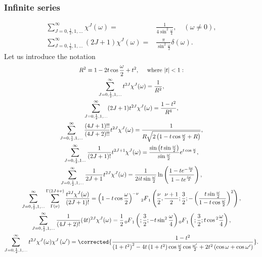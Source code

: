 \subsubsection{ Infinite series}
\begin{align}
\sum_{J=0, \frac{1}{2}, 1, \ldots}^{\infty} \chi^{J}(\omega)=&\frac{1}{4 \sin ^{2} \frac{\omega}{4}}, \quad(\omega \neq 0) , \label{eq:4:14:52}\\
\sum_{J=0, \frac{1}{2}, 1, \ldots}^{\infty}(2 J+1) \chi^{J}(\omega)=&\frac{\pi}{\sin ^{2} \frac{\omega}{2}} \delta(\omega) .\label{eq:4:14:53}
\end{align}
Let us introduce the notation
\begin{gather}
R^{2} \equiv 1-2 t \cos \frac{\omega}{2}+t^{2}, \quad \text { where }|t|<1:  \label{eq:4:14:54}\\
\sum_{J=0, \frac{1}{2}, 1, \ldots}^{\infty} t^{2 J} \chi^{J}(\omega)=\frac{1}{R^{2}},  \label{eq:4:14:55}\\
\sum_{J=0, \frac{1}{2}, 1, \ldots}^{\infty}(2 J+1) t^{2 J} \chi^{J}(\omega)=\frac{1-t^{2}}{R^{4}},  \label{eq:4:14:56}\\
\sum_{J=0, \frac{1}{2}, 1, \ldots}^{\infty} \frac{(4 J+1)!!}{(4 J+2)!!} t^{2 J} \chi^{J}(\omega)=\frac{1}{R \sqrt{2\left(1-t \cos \frac{\omega}{2}+R\right)}},  \label{eq:4:14:57}\\
\sum_{J=0, \frac{1}{2}, 1 \ldots}^{\infty} \frac{1}{(2 J+1)!} t^{2 J+1} \chi^{J}(\omega)=\frac{\sin \left(t \sin \frac{\omega}{2}\right)}{\sin \frac{\omega}{2}} e^{t \cos \frac{\omega}{2}},  \label{eq:4:14:58}\\
\sum_{J=0, \frac{1}{2}, 1, \ldots}^{\infty} \frac{1}{2 J+1} t^{2 J} \chi^{J}(\omega)=\frac{1}{2 i t \sin \frac{\omega}{2}} \ln \left(\frac{1-t e^{-\frac{i \omega}{2}}}{1-t e^{\frac{i \omega}{2}}}\right),  \label{eq:4:14:59}\\
\sum_{J=0, \frac{1}{2}, 1, \ldots}^{\infty} \sum_{\Gamma(\nu)}^{\Gamma(2 J+\nu)} \frac{t^{2 J} \chi^{J}(\omega)}{(2 J+1)!}=\left(1-t \cos \frac{\omega}{2}\right)^{-\nu}{ }\Fhg{2}{1}\left(\frac{\nu}{2}, \frac{\nu+1}{2} ; \frac{3}{2} ;-\left(\frac{t \sin \frac{\omega}{2}}{1-t \cos \frac{\omega}{2}}\right)^{2}\right),  \label{eq:4:14:60}\\
\sum_{J=0, \frac{1}{2}, 1, \ldots}^{\infty} \frac{1}{(4 J+2)!}(4 t)^{2 J} \chi^{J}(\omega)=\frac{1}{2} \Fhg{0}{1}\left(; \frac{3}{2} ;-t \sin ^{2} \frac{\omega}{4}\right)\Fhg{0}{1}\left(; \frac{3}{2} ; t \cos { }^{2} \frac{\omega}{4}\right),  \label{eq:4:14:61}\\
\sum_{J=0, \frac{1}{2}, 1, \ldots}^{\infty} t^{2 J} \chi^{J}(\omega) \chi^{J}\left(\omega^{\prime}\right)=\corrected{\frac{1-t^{2}}{\left(1+t^{2}\right)^{2}-4 t\left(1+t^{2}\right) \cos \frac{\omega}{2} \cos \frac{\omega^{\prime}}{2}+2 t^{2}\left(\cos \omega+\cos \omega^{\prime}\right)}} . \label{eq:4:14:62}
\end{gather}
